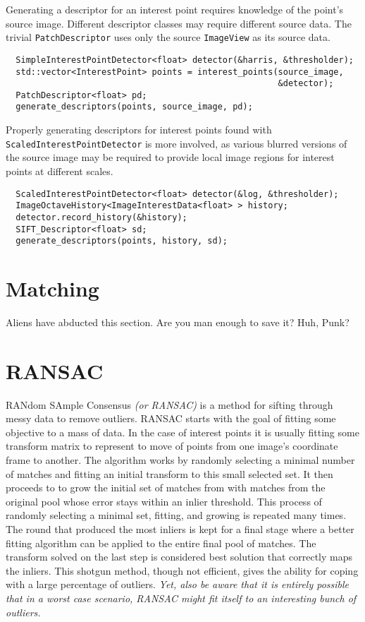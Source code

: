Generating a descriptor for an interest point requires knowledge
of the point's source image. Different descriptor classes may
require different source data. The trivial {\tt PatchDescriptor}
uses only the source {\tt ImageView} as its source data.

\begin{verbatim}
  SimpleInterestPointDetector<float> detector(&harris, &thresholder);
  std::vector<InterestPoint> points = interest_points(source_image,
                                                      &detector);
  PatchDescriptor<float> pd;
  generate_descriptors(points, source_image, pd);
\end{verbatim}

Properly generating descriptors for interest points found with
{\tt ScaledInterestPointDetector} is more involved, as various
blurred versions of the source image may be required to provide
local image regions for interest points at different scales.

\begin{verbatim}
  ScaledInterestPointDetector<float> detector(&log, &thresholder);
  ImageOctaveHistory<ImageInterestData<float> > history;
  detector.record_history(&history);
  SIFT_Descriptor<float> sd;
  generate_descriptors(points, history, sd);
\end{verbatim}

\section{Matching}

Aliens have abducted this section. Are you man enough to save it? Huh,
Punk?

\section{RANSAC}

RANdom SAmple Consensus {\em (or RANSAC)} is a method for sifting through
messy data to remove outliers. RANSAC starts with the goal of fitting
some objective to a mass of data. In the case of interest points it is
usually fitting some transform matrix to represent to move of points
from one image's coordinate frame to another. The algorithm works by
randomly selecting a minimal number of matches and fitting an initial
transform to this small selected set. It then proceeds to to grow the
initial set of matches from with matches from the original pool whose
error stays within an inlier threshold. This process of randomly
selecting a minimal set, fitting, and growing is repeated many
times. The round that produced the most inliers is kept for a final
stage where a better fitting algorithm can be applied to the entire
final pool of matches. The transform solved on the last step is
considered best solution that correctly maps the inliers. This shotgun
method, though not efficient, gives the ability for coping with a
large percentage of outliers. {\em Yet, also be aware that it is entirely
possible that in a worst case scenario, RANSAC might fit itself to an
interesting bunch of outliers.}

